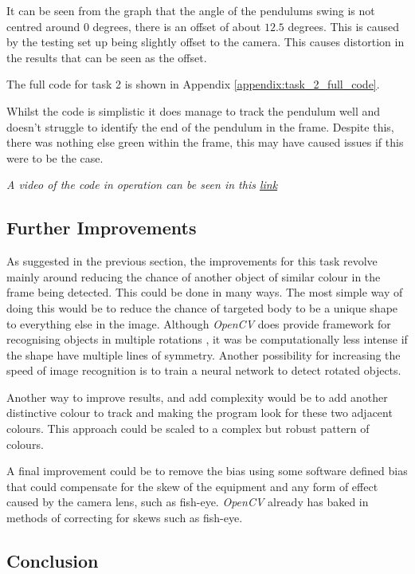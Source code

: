 \documentclass[conference]{IEEEtran}
\begin{document}
It can be seen from the graph that the angle of the pendulums swing is not centred around $0$ degrees, there is an offset of about $12.5$ degrees. This is caused by the testing set up being slightly offset to the camera. This causes distortion in the results that can be seen as the offset. 

The full code for task 2 is shown in Appendix \ref{appendix:task_2_full_code}.

Whilst the code is simplistic it does manage to track the pendulum well and doesn't struggle to identify the end of the pendulum in the frame. Despite this, there was nothing else green within the frame, this may have caused issues if this were to be the case. 

\textit{A video of the code in operation can be seen in this \href{https://github.com/LukeDWaller99/Aint308}{link}}

\subsection{Further Improvements}

As suggested in the previous section, the improvements for this task revolve mainly around reducing the chance of another object of similar colour in the frame being detected. This could be done in many ways. The most simple way of doing this would be to reduce the chance of targeted body to be a unique shape to everything else in the image. Although \textit{OpenCV} does provide framework for recognising objects in multiple rotations \cite{ref:object_orientation}, it was be computationally less intense if the shape have multiple lines of symmetry. Another possibility for increasing the speed of image recognition is to train a neural network to detect rotated objects. \cite{9578190} 

Another way to improve results, and add complexity would be to add another distinctive colour to track and making the program look for these two adjacent colours. This approach could be scaled to a complex but robust pattern of colours. 

A final improvement could be to remove the bias using some software defined bias that could compensate for the skew of the equipment and any form of effect caused by the camera lens, such as fish-eye. \textit{OpenCV} already has baked in methods of correcting for skews such as fish-eye. \cite{ref:fish-eye}

\subsection{Conclusion}
\end{document}
